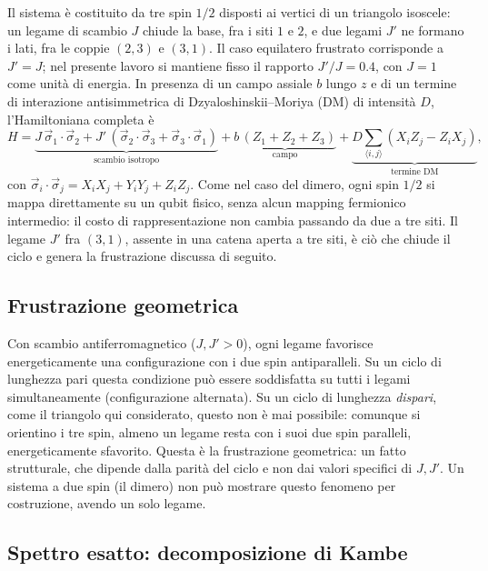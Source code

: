 \documentclass[11pt,a4paper]{article}
\begin{document}
Il sistema è costituito da tre spin $1/2$ disposti ai vertici di un
triangolo isoscele: un legame di scambio $J$ chiude la base, fra i siti
$1$ e $2$, e due legami $J'$ ne formano i lati, fra le coppie $(2,3)$ e
$(3,1)$. Il caso equilatero frustrato corrisponde a $J'=J$; nel presente
lavoro si mantiene fisso il rapporto $J'/J=0.4$, con $J=1$ come unità di
energia. In presenza di un campo assiale $b$ lungo $z$ e di un termine di
interazione antisimmetrica di Dzyaloshinskii--Moriya (DM) di intensità
$D$, l'Hamiltoniana completa è
\begin{equation}
H = \underbrace{J\,\vec\sigma_1\!\cdot\!\vec\sigma_2 +
J'\,(\vec\sigma_2\!\cdot\!\vec\sigma_3+\vec\sigma_3\!\cdot\!\vec\sigma_1)}_{\text{scambio isotropo}}
+ \underbrace{b\,(Z_1+Z_2+Z_3)}_{\text{campo}}
+ \underbrace{D\sum_{\langle i,j\rangle} (X_iZ_j-Z_iX_j)}_{\text{termine DM}},
\label{eq:H}
\end{equation}
con $\vec\sigma_i\cdot\vec\sigma_j=X_iX_j+Y_iY_j+Z_iZ_j$. Come nel caso del
dimero, ogni spin $1/2$ si mappa direttamente su un qubit fisico, senza
alcun mapping fermionico intermedio: il costo di rappresentazione non
cambia passando da due a tre siti. Il legame $J'$ fra $(3,1)$, assente in
una catena aperta a tre siti, è ciò che chiude il ciclo e genera la
frustrazione discussa di seguito.

\subsection{Frustrazione geometrica}

Con scambio antiferromagnetico ($J,J'>0$), ogni legame favorisce
energeticamente una configurazione con i due spin antiparalleli. Su un
ciclo di lunghezza pari questa condizione può essere soddisfatta su tutti
i legami simultaneamente (configurazione alternata). Su un ciclo di
lunghezza \emph{dispari}, come il triangolo qui considerato, questo non è
mai possibile: comunque si orientino i tre spin, almeno un legame resta
con i suoi due spin paralleli, energeticamente sfavorito. Questa è la
frustrazione geometrica: un fatto strutturale, che dipende dalla parità
del ciclo e non dai valori specifici di $J,J'$. Un sistema a due spin (il
dimero) non può mostrare questo fenomeno per costruzione, avendo un solo
legame.

\subsection{Spettro esatto: decomposizione di Kambe}
\end{document}
